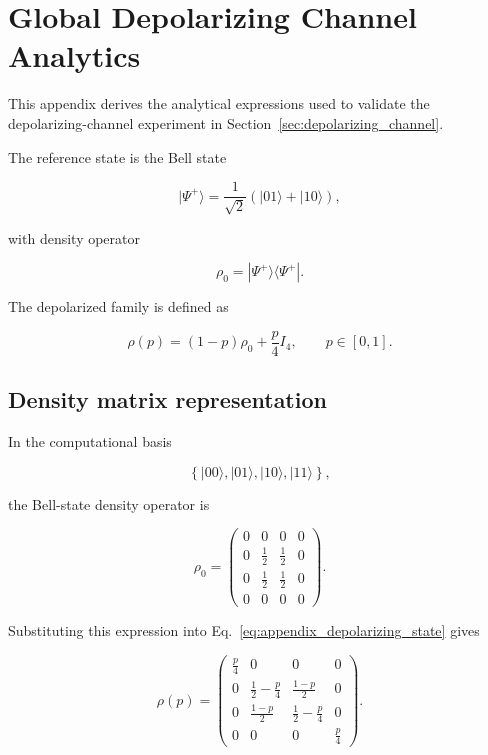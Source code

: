 
\section{Global Depolarizing Channel Analytics}
\label{app:depolarizing_channel_analytics}

This appendix derives the analytical expressions used to validate the depolarizing-channel experiment in Section~\ref{sec:depolarizing_channel}.

The reference state is the Bell state

\[
|\Psi^+\rangle
=
\frac{1}{\sqrt{2}}
\left(
|01\rangle + |10\rangle
\right),
\]

with density operator

\[
\rho_0
=
|\Psi^+\rangle
\langle\Psi^+|.
\]

The depolarized family is defined as

\begin{equation}
\rho(p)
=
(1-p)\rho_0
+
\frac{p}{4}I_4,
\qquad
p \in [0,1].
\label{eq:appendix_depolarizing_state}
\end{equation}


\subsection*{Density matrix representation}

In the computational basis

\[
\left\{
|00\rangle,
|01\rangle,
|10\rangle,
|11\rangle
\right\},
\]

the Bell-state density operator is

\[
\rho_0
=
\begin{pmatrix}
0 & 0 & 0 & 0 \\
0 & \frac{1}{2} & \frac{1}{2} & 0 \\
0 & \frac{1}{2} & \frac{1}{2} & 0 \\
0 & 0 & 0 & 0
\end{pmatrix}.
\]

Substituting this expression into Eq.~\eqref{eq:appendix_depolarizing_state} gives

\[
\rho(p)
=
\begin{pmatrix}
\frac{p}{4} & 0 & 0 & 0 \\
0 & \frac{1}{2}-\frac{p}{4} & \frac{1-p}{2} & 0 \\
0 & \frac{1-p}{2} & \frac{1}{2}-\frac{p}{4} & 0 \\
0 & 0 & 0 & \frac{p}{4}
\end{pmatrix}.
\]


